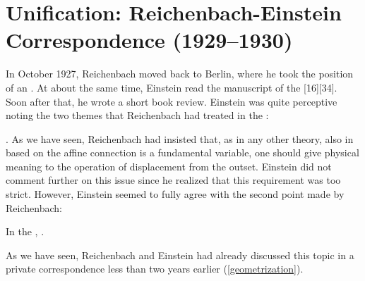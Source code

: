 \documentclass[final]{article}
\renewcommand{\me}{;~m.e.{}}
\newcommand{\PRZL}{\citetitle{Reichenbach1928}\xspace}
\begin{document}
\section{Unification: Reichenbach-Einstein Correspondence (1929--1930)}
\label{unification}
%
In October 1927, Reichenbach moved back to Berlin, where he took the position of an  \citep{Hecht1982}. At about the same time, Einstein read the manuscript of the \PRZL {}[16][34]. Soon after that, he wrote a short book review. Einstein was quite perceptive noting the two themes that Reichenbach had treated in the \Ap: \begin{inparaenum}[(1)] \item {} \citep[20\me]{Einstein1928d}. As we have seen, Reichenbach had insisted that, as in any other theory, also in \uft based on the affine connection is a fundamental variable, one should give physical meaning to the operation of displacement from the outset. Einstein did not comment further on this issue since he realized that this requirement was too strict. However, Einstein seemed to fully agree with the second point made by Reichenbach: \item In the \Ap,  \citep[20\me]{Einstein1928d}. \end{inparaenum} As we have seen, Reichenbach and Einstein had already discussed this topic in a private correspondence less than two years earlier (\cref{geometrization}). 
\end{document}

